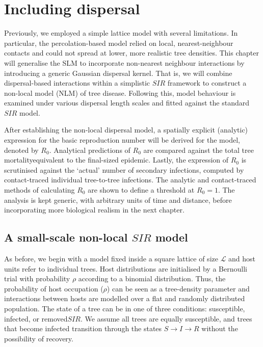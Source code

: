 \chapter{Including dispersal}

\label{ch5:dispersal-model}
Previously, we employed a simple lattice model with several limitations. 
In particular, the percolation-based model relied on local, nearest-neighbour contacts and could not spread at lower, more realistic tree densities. 
This chapter will generalise the SLM to incorporate non-nearest neighbour interactions by introducing a generic Gaussian dispersal kernel.
That is, we will combine dispersal-based interactions within a simplistic $SIR$ framework to construct a non-local model (NLM) of tree disease.
Following this, model behaviour is examined under various dispersal length scales and fitted against the standard $SIR$ model.

After establishing the non-local dispersal model, a spatially explicit (analytic) expression for the basic reproduction number will be derived for the model, denoted by $R_0$.
Analytical predictions of $R_0$ are compared against the total tree mortality\textemdash equivalent to the final-sized epidemic.
Lastly, the expression of $R_0$ is scrutinised against the `actual' number of secondary infections, computed by contact-traced individual tree-to-tree infections.
The analytic and contact-traced methods of calculating $R_0$ are shown to define a threshold at $R_0=1$.
The analysis is kept generic, with arbitrary units of time and distance, before incorporating more biological realism in the next chapter. 

\section{A small-scale non-local $SIR$ model}
\label{section:sgm-expo}

As before, we begin with a model fixed inside a square lattice of size $\mathcal{L}$ and host units refer to individual trees.
Host distributions are initialised by a Bernoulli trial with probability $\rho$ according to a binomial distribution.
Thus, the probability of host occupation ($\rho$) can be seen as a tree-density parameter and interactions between hosts are modelled over a flat and randomly distributed population.
The state of a tree can be in one of three conditions: susceptible, infected, or removed\textemdash $SIR$.
We assume all trees are equally susceptible, and trees that become infected transition through the states $S\rightarrow I\rightarrow R$ without the possibility of recovery.

